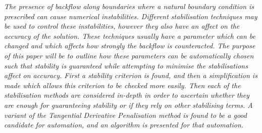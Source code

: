 \textit{
The presence of backflow along boundaries where a natural boundary condition is prescribed can cause numerical instabilities. Different stabilisation techniques may be used to control these instabilities, however they also have an affect on the accuracy of the solution. These techniques usually have a parameter which can be changed and which affects how strongly the backflow is counteracted. The purpose of this paper will be to outline how these parameters can be automatically chosen such that stability is guaranteed while attempting to minimise the stabilisations affect on accuracy. First a stability criterion is found, and then a simplification is made which allows this criterion to be checked more easily. Then each of the stabilisation methods are considered in-depth in order to ascertain whether they are enough for guaranteeing stability or if they rely on other stabilising terms. A variant of the Tangential Derivative Penalisation method is found to be a good candidate for automation, and an algorithm is presented for that automation.
}